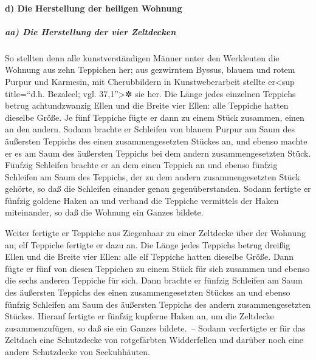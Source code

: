 \hypertarget{d-die-herstellung-der-heiligen-wohnung}{%
\paragraph{d) Die Herstellung der heiligen
Wohnung}\label{d-die-herstellung-der-heiligen-wohnung}}

\hypertarget{aa-die-herstellung-der-vier-zeltdecken}{%
\subparagraph{aa) Die Herstellung der vier
Zeltdecken}\label{aa-die-herstellung-der-vier-zeltdecken}}

 So stellten denn alle kunstverständigen Männer unter den
Werkleuten die Wohnung aus zehn Teppichen her; aus gezwirntem Byssus,
blauem und rotem Purpur und Karmesin, mit Cherubbildern in
Kunstweberarbeit stellte er\textless sup title=``d.h. Bezaleel; vgl.
37,1''\textgreater✲ sie her.  Die Länge jedes einzelnen
Teppichs betrug achtundzwanzig Ellen und die Breite vier Ellen: alle
Teppiche hatten dieselbe Größe.  Je fünf Teppiche fügte
er dann zu einem Stück zusammen, einen an den andern. 
Sodann brachte er Schleifen von blauem Purpur am Saum des äußersten
Teppichs des einen zusammengesetzten Stückes an, und ebenso machte er es
am Saum des äußersten Teppichs bei dem andern zusammengesetzten Stück.
 Fünfzig Schleifen brachte er an dem einen Teppich an und
ebenso fünfzig Schleifen am Saum des Teppichs, der zu dem andern
zusammengesetzten Stück gehörte, so daß die Schleifen einander genau
gegenüberstanden.  Sodann fertigte er fünfzig goldene
Haken an und verband die Teppiche vermittels der Haken miteinander, so
daß die Wohnung ein Ganzes bildete.

 Weiter fertigte er Teppiche aus Ziegenhaar zu einer
Zeltdecke über der Wohnung an; elf Teppiche fertigte er dazu an.
 Die Länge jedes Teppichs betrug dreißig Ellen und die
Breite vier Ellen: alle elf Teppiche hatten dieselbe Größe.
 Dann fügte er fünf von diesen Teppichen zu einem Stück
für sich zusammen und ebenso die sechs anderen Teppiche für sich.
 Dann brachte er fünfzig Schleifen am Saum des äußersten
Teppichs des einen zusammengesetzten Stückes an und ebenso fünfzig
Schleifen am Saum des äußersten Teppichs des andern zusammengesetzten
Stückes.  Hierauf fertigte er fünfzig kupferne Haken an,
um die Zeltdecke zusammenzufügen, so daß sie ein Ganzes bildete.~--
 Sodann verfertigte er für das Zeltdach eine Schutzdecke
von rotgefärbten Widderfellen und darüber noch eine andere Schutzdecke
von Seekuhhäuten.

